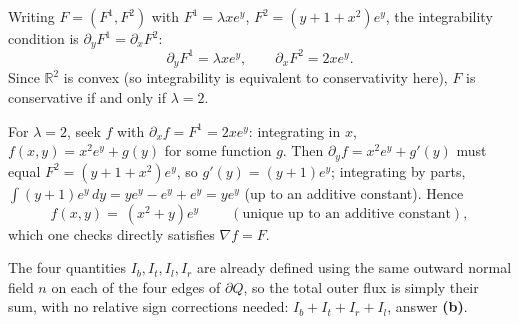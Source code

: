 \begin{exercisesolution}
\label{sol:conservative_vector_field_potential}
Writing $F = (F^1,F^2)$ with $F^1 = \lambda xe^y$, $F^2 = (y+1+x^2)e^y$, the integrability
condition is $\partial_yF^1 = \partial_xF^2$:
\[\partial_yF^1 = \lambda xe^y, \qquad \partial_xF^2 = 2xe^y.\]
Since $\mathbb{R}^2$ is convex (so integrability is equivalent to conservativity here), $F$
is conservative if and only if $\lambda=2$.

For $\lambda=2$, seek $f$ with $\partial_xf = F^1 = 2xe^y$: integrating in $x$,
$f(x,y) = x^2e^y + g(y)$ for some function $g$. Then $\partial_yf = x^2e^y+g'(y)$ must equal
$F^2 = (y+1+x^2)e^y$, so $g'(y) = (y+1)e^y$; integrating by parts, $\int(y+1)e^y\,dy =
ye^y - e^y + e^y = ye^y$ (up to an additive constant). Hence
\[f(x,y) = \boxed{\ (x^2+y)e^y\ } \qquad (\text{unique up to an additive constant}),\]
which one checks directly satisfies $\nabla f = F$.
\end{exercisesolution}


\begin{exercisesolution}
\label{sol:outward_flux_sign_convention}
The four quantities $I_b,I_t,I_l,I_r$ are already defined using the same outward normal field
$n$ on each of the four edges of $\partial Q$, so the total outer flux is simply their sum,
with no relative sign corrections needed: $\boxed{I_b+I_t+I_r+I_l}$, answer \textbf{(b)}.
\end{exercisesolution}


